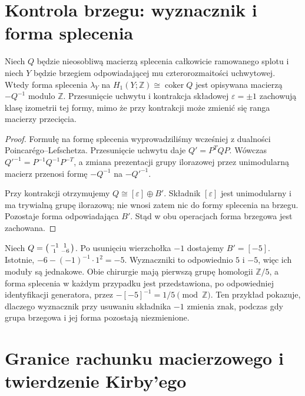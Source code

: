 \section{Kontrola brzegu: wyznacznik i forma splecenia}
\label{sec:tg-kirby-linking}

\begin{stwierdzenie}
Niech $Q$ będzie nieosobliwą macierzą splecenia
całkowicie ramowanego splotu i niech $Y$ będzie
brzegiem odpowiadającej mu czterorozmaitości uchwytowej.
Wtedy forma splecenia $\lambda_Y$ na
$H_1(Y;\mathbb Z)\cong\operatorname{coker}Q$ jest
opisywana macierzą $-Q^{-1}$ modulo $\mathbb Z$.
Przesunięcie uchwytu i kontrakcja składowej
$\varepsilon=\pm1$ zachowują klasę izometrii
tej formy, mimo że przy kontrakcji może zmienić
się ranga macierzy przecięcia.
\end{stwierdzenie}
\begin{proof}
Formułę na formę splecenia wyprowadziliśmy wcześniej
z dualności Poincarégo--Lefschetza. Przesunięcie
uchwytu daje $Q'=P^TQP$. Wówczas
${Q'}^{-1}=P^{-1}Q^{-1}P^{-T}$, a zmiana
prezentacji grupy ilorazowej przez unimodularną
macierz przenosi formę $-Q^{-1}$ na $-{Q'}^{-1}$.

Przy kontrakcji otrzymujemy
$Q\cong[\varepsilon]\oplus B'$.
Składnik $[\varepsilon]$ jest unimodularny i ma
trywialną grupę ilorazową; nie wnosi zatem nic do
formy splecenia na brzegu. Pozostaje forma
odpowiadająca $B'$. Stąd w obu operacjach
forma brzegowa jest zachowana.
\end{proof}

\begin{przyklad}
Niech $Q=\begin{psmallmatrix}-1&1\\1&-6\end{psmallmatrix}$.
Po usunięciu wierzchołka $-1$ dostajemy $B'=[-5]$.
Istotnie, $-6-(-1)^{-1}\cdot1^2=-5$.
Wyznaczniki to odpowiednio $5$ i $-5$,
więc ich moduły są jednakowe. Obie chirurgie
mają pierwszą grupę homologii $\mathbb Z/5$,
a forma splecenia w każdym przypadku jest
przedstawiona, po odpowiedniej identyfikacji
generatora, przez $-[-5]^{-1}=1/5\pmod{\mathbb Z}$.
Ten przykład pokazuje, dlaczego wyznacznik
przy usuwaniu składnika $-1$ zmienia znak, podczas
gdy grupa brzegowa i jej forma pozostają niezmienione.
\end{przyklad}

\section{Granice rachunku macierzowego i twierdzenie Kirby'ego}
\label{sec:tg-kirby-scope}

